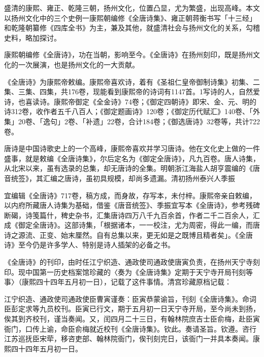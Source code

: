 盛清的康熙、雍正、乾隆三朝，扬州文化，位置凸显，尤为繁盛，出现高峰。本文以扬州文化中的三个史例一康熙朝编修《全唐诗集》、雍正朝蒋衡书写「十三经」和乾隆朝纂修《四库全书》为主，兼及其他，就盛清社会与扬州文化的关系，勾稽史料，略加探讨。

康熙朝编修《全唐诗》，功在当朝，影响至今。《全唐诗》在扬州刻印，既是扬州文化的一次展演，也是扬州文化的一大贡献。

《全唐诗》为康熙帝敕编。康熙帝喜欢诗，着有《圣祖仁皇帝御制诗集》初集、二集、三集、四集，共176卷，现能看到康熙帝的诗词有1147首。1写诗的人，自然爱诗，也喜读诗。康熙帝御定《全金诗》74卷；《御定四朝诗》即宋、金、元、明的诗312卷，收作者五千八百人；《御定题画诗》120卷；《御定历代赋汇》140卷、「外集」20卷、「逸句」2卷、「补遗」22卷，合计184卷；《御选唐诗》32卷等，共计722卷。

唐诗是中国诗歌史上的一个高峰，康熙帝喜欢并学习唐诗。他在文化史上做的一件盛事，就是敕编《全唐诗集》，尔后定名为《御定全唐诗》，凡九百卷。唐人诗集，从北宋以来，虽有选录的总集，却无唐诗的全集。明朝浙江海盐人胡亨震编的《唐音统签》，其汇编之唐诗，虽初具规模，却尚多遗漏。清初扬州泰兴人季振

\vfill
\begin{BookNotes}
\end{BookNotes}

\noindent 宜编辑《全唐诗》717卷，稿方成，而身故，存写本，未付梓。康熙帝亲自敕编，以内府所藏唐人诗集为基础，借鉴《唐音统签》、季振宜写本《全唐诗》，参考残碑断碣，诗笺篇什，稗史杂书，汇集唐诗四万八千九百余首，作者二千二百余人，汇成《御定全唐诗》。这部诗集，「根据诸本，一一校注，尤为周密，得此一编，而唐诗之源流、正变、始末厘然。自有总集以来，更无如是之既博且精者矣」。《全唐诗》至今仍是许多学人、特别是诗人插架的必备之书。

《全唐诗》的刊印，由时任江宁织造、通政使司通政使唐寅负责，在扬州天宁寺刻印。现中国第一历史档案馆珍藏的〈奏为《全唐诗集》定期于天宁寺开局刊刻等事〉（康熙四十四年五月初一日），记载了这件事情。清宫珍藏原档记载：

\begin{BookQuote}
江宁织造、通政使司通政使臣曹寅谨奏：臣寅恭蒙谕旨，刊刻《全唐诗集》。命词臣彭定求等九员校刊。臣寅已行文，期于五月初一日天宁寺开局，至今尚未到扬，俟其到齐校刊，谨当奏闻。又，闰四月二十三日，有翰林院庶吉士臣俞梅，赴臣寅衙门，口传上谕，命臣俞梅就近校刊《全唐诗集》。钦此。奏请圣旨。钦遵。咨行江苏巡抚臣宋荦，移咨吏部、翰林院衙门，俟刊刻完日，该衙门一并具本奏闻。康熙四十四年五月初一日。
\end{BookQuote}

